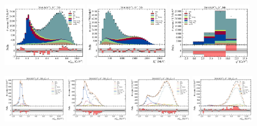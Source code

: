 \begin{figure}[htb]
    \centering
    \includegraphics[width=0.32\textwidth]{./figs-supplemental-plots/pre-ctrl-fit/stacked/fit_result-stacked-Dst-dd-mmiss2.pdf}
    \includegraphics[width=0.32\textwidth]{./figs-supplemental-plots/pre-ctrl-fit/stacked/fit_result-stacked-Dst-dd-el.pdf}
    \includegraphics[width=0.32\textwidth]{./figs-supplemental-plots/pre-ctrl-fit/stacked/fit_result-stacked-Dst-dd-q2.pdf}

    \includegraphics[width=0.24\textwidth]{./figs-supplemental-plots/pre-ctrl-fit/lines_q2_slices/fit_result-lines_q2_idx1-Dst-dd-mmiss2.pdf}
    \includegraphics[width=0.24\textwidth]{./figs-supplemental-plots/pre-ctrl-fit/lines_q2_slices/fit_result-lines_q2_idx2-Dst-dd-mmiss2.pdf}
    \includegraphics[width=0.24\textwidth]{./figs-supplemental-plots/pre-ctrl-fit/lines_q2_slices/fit_result-lines_q2_idx3-Dst-dd-mmiss2.pdf}
    \includegraphics[width=0.24\textwidth]{./figs-supplemental-plots/pre-ctrl-fit/lines_q2_slices/fit_result-lines_q2_idx4-Dst-dd-mmiss2.pdf}


\end{figure}
